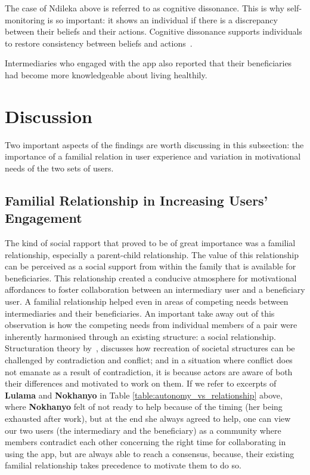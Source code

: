 The case of Ndileka above is referred to as cognitive dissonance. This is why self-monitoring is so important: it shows an individual if there is a discrepancy between their beliefs and their actions. Cognitive dissonance supports individuals to restore consistency between beliefs and actions~\citep{Oinas-kukkonen:psd}.

Intermediaries who engaged with the app also reported that their beneficiaries had become more knowledgeable about living healthily. 
\section{Discussion}
Two important aspects of the findings are worth discussing in this subsection: the importance of a familial relation in user experience and variation in motivational needs of the two sets of users.
\subsection{Familial Relationship in Increasing Users' Engagement} 
The kind of social rapport that proved to be of great importance was a familial relationship, especially a parent-child relationship. The value of this relationship can be perceived as a social support from within the family that is available for beneficiaries. This relationship created a conducive atmosphere for motivational affordances to foster collaboration between an intermediary user and a beneficiary user. A familial relationship helped even in areas of competing needs between intermediaries and their beneficiaries. An important take away out of this observation is how the competing needs from individual members of a pair were inherently harmonised through an existing structure: a social relationship. Structuration theory by~\cite{jones2008giddens}, discusses how recreation of societal structures can be challenged by contradiction and conflict; and in a situation where conflict does not emanate as a result of contradiction, it is because actors are aware of both their differences and motivated to work on them. If we refer to excerpts of \textbf{Lulama} and \textbf{Nokhanyo} in Table \ref{table:autonomy_vs_relationship} above, where \textbf{Nokhanyo} felt of not ready to help because of the timing (her being exhausted after work), but at the end she always agreed to help, one can view our two users (the intermediary and the beneficiary) as a community where members contradict each other concerning the right time for collaborating in using the app, but are always able to reach a consensus, because, their existing familial relationship takes precedence to motivate them to do so. 
  
